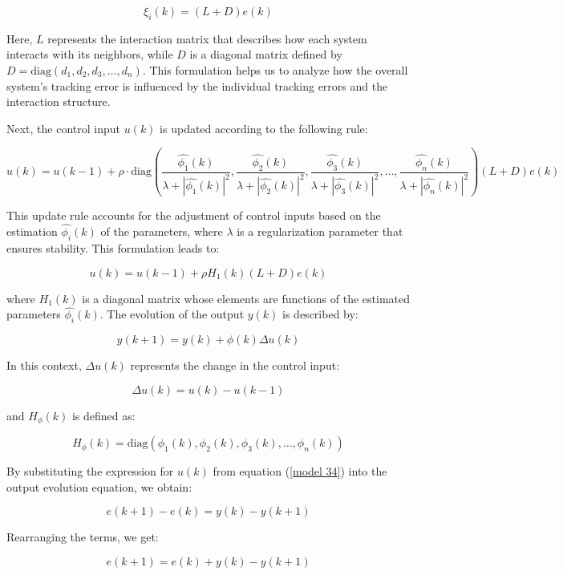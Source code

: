 \documentclass[journal,onecolumn]{IEEEtran}
\begin{document}
\begin{equation}
    \label{model 33}
    \xi_i(k) = (L + D) e(k)
\end{equation}

Here, \(L\) represents the interaction matrix that describes how each system interacts with its neighbors, while \(D\) is a diagonal matrix defined by \(D = \text{diag}(d_1, d_2, d_3, \dots, d_n)\). This formulation helps us to analyze how the overall system's tracking error is influenced by the individual tracking errors and the interaction structure.

Next, the control input \(u(k)\) is updated according to the following rule:

\[
u(k) = u(k-1) + \rho \cdot \text{diag}\left(\frac{\hat{\phi_1}(k)}{\lambda + |\hat{\phi_1}(k)|^2}, \frac{\hat{\phi_2}(k)}{\lambda + |\hat{\phi_2}(k)|^2}, \frac{\hat{\phi_3}(k)}{\lambda + |\hat{\phi_3}(k)|^2}, \dots, \frac{\hat{\phi_n}(k)}{\lambda + |\hat{\phi_n}(k)|^2}\right) (L + D) e(k)
\]

This update rule accounts for the adjustment of control inputs based on the estimation \(\hat{\phi_i}(k)\) of the parameters, where \(\lambda\) is a regularization parameter that ensures stability. This formulation leads to:

\begin{equation}
    \label{model 34}
    u(k) = u(k-1) + \rho H_1(k) (L + D) e(k)
\end{equation}

where \(H_1(k)\) is a diagonal matrix whose elements are functions of the estimated parameters \(\hat{\phi_i}(k)\). The evolution of the output \(y(k)\) is described by:

\[
y(k+1) = y(k) + \phi(k) \Delta u(k)
\]

In this context, \(\Delta u(k)\) represents the change in the control input:

\[
\Delta u(k) = u(k) - u(k-1)
\]

and \(H_\phi(k)\) is defined as:

\[
H_\phi(k) = \text{diag}(\phi_1(k), \phi_2(k), \phi_3(k), \dots, \phi_n(k))
\]

By substituting the expression for \(u(k)\) from equation (\ref{model 34}) into the output evolution equation, we obtain:

\[
e(k+1) - e(k) = y(k) - y(k+1)
\]

Rearranging the terms, we get:

\[
e(k+1) = e(k) + y(k) - y(k+1)
\]
\end{document}
